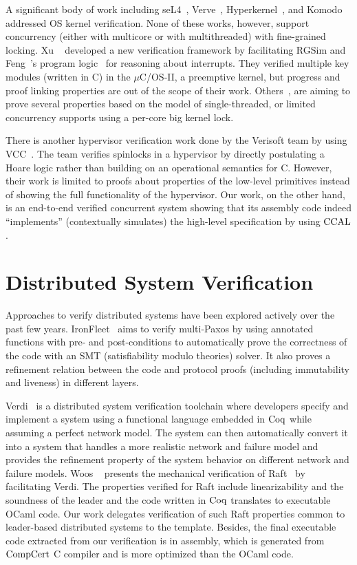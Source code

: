A significant body
of  work including
seL4~\cite{klein2009sel4,klein14},
Verve~\cite{hawblitzel10}, Hyperkernel~\cite{hyperkernel}, and Komodo~\cite{komodo}
addressed OS kernel verification.
None of these works, however, support concurrency (either with multicore or with multithreaded)  with fine-grained locking.
Xu \etal~\cite{xu16} developed a new verification framework by facilitating RGSim
and Feng~\etal's program logic~\cite{feng08:aim} for reasoning
about interrupts.
They verified multiple  key modules (written in C) 
in the $\mu$C/OS-II, a preemptive kernel,
 but progress and proof linking properties are out of the scope of their work. 
Others~\cite{klein2009sel4,hawblitzel10, hyperkernel, komodo},
are aiming to prove several properties based on the model of single-threaded, or limited concurrency supports using a per-core big kernel lock.

There is another hypervisor verification work done by the Verisoft team by using VCC~\cite{leinenbach09}.
The team verifies spinlocks in a hypervisor by directly postulating a Hoare logic rather than building
on an operational semantics for C.
However, their work is limited to proofs about properties of the low-level primitives 
instead of showing the full functionality of
the hypervisor.
Our work, on the other hand, 
is an end-to-end verified concurrent system showing that its
assembly code indeed ``implements'' (contextually simulates) the
high-level specification by using $\mathrm{CCAL}$.

\section{Distributed System Verification}
\label{chatper:related:sec:distributed-system-verification}

Approaches to verify distributed systems have been explored actively over the
past few years. 
IronFleet~\cite{ironfleet} aims to verify multi-Paxos by using annotated functions with pre- and
post-conditions to automatically prove the correctness of the code with an SMT (satisfiability
modulo theories) solver.
It also proves a refinement relation between the code and
protocol proofs (including immutability and liveness) in different layers. 

Verdi~\cite{verdi} is a distributed system verification toolchain
where developers specify and implement a system using a functional language
embedded in $\mathrm{Coq}$ while assuming a perfect network model. 
The system can then automatically convert
it into a system that handles a more realistic network and failure model
and provides the refinement property of the system behavior on different network and failure models.
Woos \etal~ presents the mechanical verification of Raft~\cite{cppraft} by facilitating Verdi. The properties
verified for Raft include linearizability and the soundness of the leader and
the code written in $\mathrm{Coq}$ translates to executable OCaml code. 
Our work delegates verification of such Raft properties common to leader-based distributed systems to the template.
Besides, the final executable code extracted from
our verification is in assembly, which is generated from $\mathrm{CompCert}$ C compiler and is more
optimized than the OCaml code.


